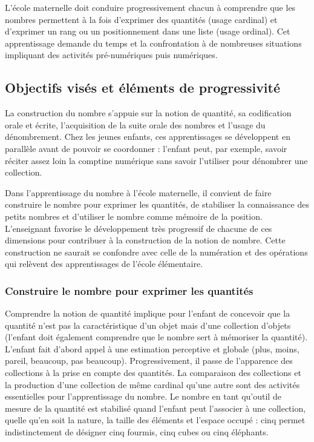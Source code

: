 L’école maternelle doit conduire progressivement chacun à comprendre que les nombres permettent à la fois d’exprimer des quantités (usage cardinal) et d’exprimer un rang ou un positionnement dans une liste (usage ordinal). Cet apprentissage demande du temps et la confrontation à de nombreuses situations impliquant des activités pré-numériques puis numériques.  

\subsection{Objectifs visés et éléments de progressivité}
La construction du nombre s’appuie sur la notion de quantité, sa codification orale et écrite, l’acquisition de la suite orale des nombres et l’usage du dénombrement. Chez les jeunes enfants, ces apprentissages se développent en parallèle avant de pouvoir se coordonner : l’enfant peut, par exemple, savoir réciter assez loin la comptine numérique sans savoir l’utiliser pour dénombrer une collection. 

Dans l’apprentissage du nombre à l’école maternelle, il convient de faire construire le nombre pour exprimer les quantités, de stabiliser la connaissance des petits nombres et d’utiliser le nombre comme mémoire de la position. L’enseignant favorise le développement très progressif de chacune de ces dimensions pour contribuer à la construction de la notion de nombre. Cette construction ne saurait se confondre avec celle de la numération et des opérations qui relèvent des apprentissages de l'école élémentaire. 

\subsubsection{Construire le nombre pour exprimer les quantités}
Comprendre la notion de quantité implique pour l’enfant de concevoir que la quantité n’est pas la caractéristique d’un objet mais d’une collection d’objets (l’enfant doit également comprendre que le nombre sert à mémoriser la quantité). L’enfant fait d’abord appel à une estimation perceptive et globale (plus, moins, pareil, beaucoup, pas beaucoup). Progressivement, il passe de l’apparence des collections à la prise en compte des quantités. La comparaison des collections et la production d’une collection de même cardinal qu’une autre sont des activités essentielles pour l’apprentissage du nombre. Le nombre en tant qu’outil de mesure de la quantité est stabilisé quand l’enfant peut l’associer à une collection, quelle qu’en soit la nature, la taille des éléments et l’espace occupé : cinq permet indistinctement de désigner cinq fourmis, cinq cubes ou cinq éléphants.

